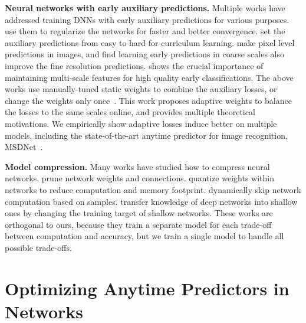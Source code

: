 \textbf{Neural networks with early auxiliary predictions.} 
Multiple works have addressed training DNNs with early auxiliary predictions for various purposes. \cite{supervisednet,inception_v4,pspnet,fractalnet} use them to regularize the networks for faster and better convergence. \cite{curriculum,feedbacknet} set the auxiliary predictions from easy to hard for curriculum learning. \cite{hed,reverse_scene_seg} make pixel level predictions in images, and find learning early predictions in coarse scales also improve the fine resolution predictions. \cite{msdense} shows the crucial importance of maintaining multi-scale features for high quality early classifications. The above works use manually-tuned static weights to combine the auxiliary losses, or change the weights only once~\cite{reverse_scene_seg}. This work proposes adaptive weights to balance the losses to the same scales online, and provides multiple theoretical motivations. We empirically show adaptive losses induce better \anns on multiple models, including the state-of-the-art anytime predictor for image recognition, MSDNet~\cite{msdense}. %

\textbf{Model compression.} 
Many  works have studied how to compress neural networks.  \cite{prune_nn,slim_nn} prune network weights and connections. \cite{binary_nn,binary_nn_eccv,squeezenet} quantize weights within networks to reduce computation and memory footprint. 
\cite{wang2017skipnet,veit2017convolutional} dynamically skip network computation based on samples.
\cite{deepreally,distillation} transfer knowledge of deep networks into shallow ones by changing the training target of shallow networks. 
These works are orthogonal to ours, because they train a separate model for each trade-off between computation and accuracy, but we train a single model to handle all possible trade-offs.




\section{Optimizing Anytime Predictors in Networks}

\label{sec:ann}

